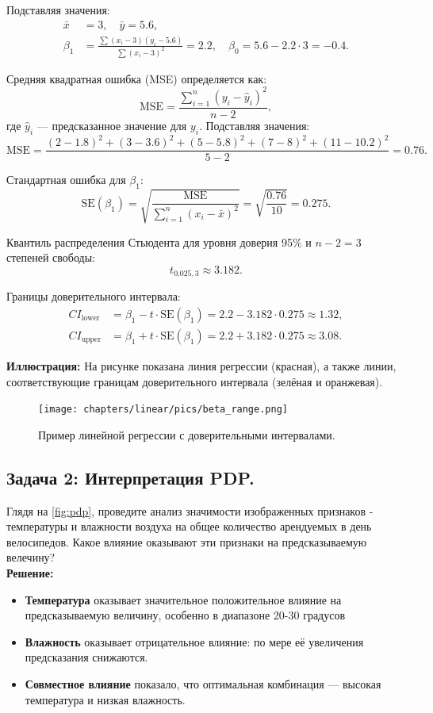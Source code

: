 \begin{itemize}
Подставляя значения:
\begin{align*}
\bar{x} &= 3, \quad \bar{y} = 5.6, \\
\beta_1 &= \frac{\sum (x_i - 3)(y_i - 5.6)}{\sum (x_i - 3)^2} = 2.2, \quad \beta_0 = 5.6 - 2.2 \cdot 3 = -0.4.
\end{align*}

Средняя квадратная ошибка (MSE) определяется как:
\[
\text{MSE} = \frac{\sum_{i=1}^n (y_i - \hat{y}_i)^2}{n - 2},
\]
где \(\hat{y}_i\) — предсказанное значение для \(y_i\). Подставляя значения:
\[
\text{MSE} = \frac{(2 - 1.8)^2 + (3 - 3.6)^2 + (5 - 5.8)^2 + (7 - 8)^2 + (11 - 10.2)^2}{5 - 2} = 0.76.
\]

Стандартная ошибка для \(\beta_1\):
\[
\text{SE}(\beta_1) = \sqrt{\frac{\text{MSE}}{\sum_{i=1}^n (x_i - \bar{x})^2}} = \sqrt{\frac{0.76}{10}} = 0.275.
\]

Квантиль распределения Стьюдента для уровня доверия 95\% и \(n-2=3\) степеней свободы:
\[
t_{0.025, 3} \approx 3.182.
\]

Границы доверительного интервала:
\begin{align*}
CI_{\text{lower}} &= \beta_1 - t \cdot \text{SE}(\beta_1) = 2.2 - 3.182 \cdot 0.275 \approx 1.32, \\
CI_{\text{upper}} &= \beta_1 + t \cdot \text{SE}(\beta_1) = 2.2 + 3.182 \cdot 0.275 \approx 3.08.
\end{align*}

\textbf{Иллюстрация:}
На рисунке показана линия регрессии (красная), а также линии, соответствующие границам доверительного интервала (зелёная и оранжевая).

\begin{figure}[h!]
    \centering
    \texttt{[image: chapters/linear/pics/beta\_range.png]}
    \caption{Пример линейной регрессии с доверительными интервалами.}
\end{figure}

\subsection*{Задача 2: Интерпретация PDP.}

Глядя на \ref{fig:pdp}, проведите анализ значимости изображенных признаков - температуры и влажности воздуха на общее количество арендуемых в день велосипедов. Какое влияние оказывают эти признаки на предсказываемую велечину? \\

\textbf{Решение:}

\begin{itemize}
 \item \textbf{Температура} оказывает значительное положительное влияние на предсказываемую величину, особенно в диапазоне 20-30 градусов
 \item \textbf{Влажность} оказывает отрицательное влияние: по мере её увеличения предсказания снижаются.
 \item \textbf{Совместное влияние} показало, что оптимальная комбинация — высокая температура и низкая влажность.
\end{itemize}


\end{itemize}
